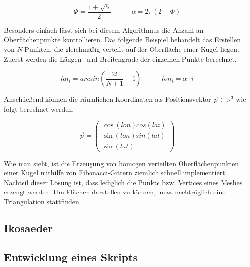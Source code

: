 $$\Phi = \frac{1 + \sqrt{5}}{2} \quad\quad\quad \alpha = 2\pi\left(2 - \Phi\right)$$

Besonders einfach lässt sich bei diesem Algorithmus die Anzahl an Oberflächenpunkte
kontrollieren. Das folgende Beispiel behandelt das Erstellen von $N$ Punkten,
die gleichmäßig verteilt auf der Oberfläche einer Kugel liegen. Zuerst werden
die Längen- und Breitengrade der einzelnen Punkte berechnet.

$$lat_i = arcsin\left(\frac{2i}{N + 1} - 1\right) \quad\quad\quad
lon_i = \alpha \cdot i$$

Anschließend können die räumlichen Koordinaten als Positionsvektor $\vec{p} \in
\mathbb{R}^3$ wie folgt berechnet werden.

\[
\vec{p} =
\left(\begin{array}{c}
    \cos\left(lon\right) cos\left(lat\right) \\
    \sin\left(lon\right) sin\left(lat\right) \\
    \sin\left(lat\right)
\end{array}\right)
\]

Wie man sieht, ist die Erzeugung von homogen verteilten Oberflächenpunkten einer
Kugel mithilfe von Fibonacci-Gittern ziemlich schnell implementiert. Nachteil
dieser Lösung ist, dass lediglich die Punkte bzw. Vertices eines Meshes erzeugt
werden. Um Flächen darstellen zu können, muss nachträglich eine Triangulation
stattfinden. 

\subsection{Ikosaeder}
\subsection{Entwicklung eines Skripts}
